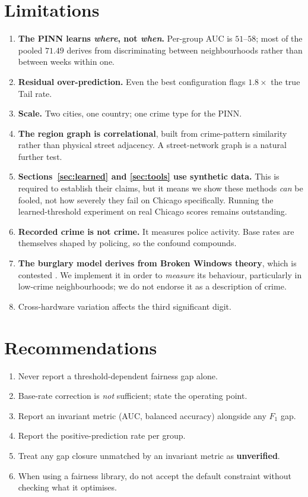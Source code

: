 \documentclass[11pt,a4paper]{article}
\begin{document}
\section{Limitations}
\begin{enumerate}\itemsep3pt
\item \textbf{The PINN learns \emph{where}, not \emph{when}.} Per-group AUC is
$51$--$58$; most of the pooled $71.49$ derives from discriminating between
neighbourhoods rather than between weeks within one.
\item \textbf{Residual over-prediction.} Even the best configuration flags
$1.8\times$ the true Tail rate.
\item \textbf{Scale.} Two cities, one country; one crime type for the PINN.
\item \textbf{The region graph is correlational}, built from crime-pattern
similarity rather than physical street adjacency. A street-network graph is a
natural further test.
\item \textbf{Sections~\ref{sec:learned} and \ref{sec:tools} use synthetic
data.} This is required to establish their claims, but it means we show these
methods \emph{can} be fooled, not how severely they fail on Chicago
specifically. Running the learned-threshold experiment on real Chicago scores
remains outstanding.
\item \textbf{Recorded crime is not crime.} It measures police activity. Base
rates are themselves shaped by policing, so the confound compounds.
\item \textbf{The burglary model derives from Broken Windows theory}, which is
contested \cite{sampson2004,goodson2021}. We implement it in order to
\emph{measure} its behaviour, particularly in low-crime neighbourhoods; we do
not endorse it as a description of crime.
\item Cross-hardware variation affects the third significant digit.
\end{enumerate}

\section{Recommendations}
\begin{enumerate}\itemsep2pt
\item Never report a threshold-dependent fairness gap alone.
\item Base-rate correction is \emph{not} sufficient; state the operating point.
\item Report an invariant metric (AUC, balanced accuracy) alongside any $F_1$ gap.
\item Report the positive-prediction rate per group.
\item Treat any gap closure unmatched by an invariant metric as \textbf{unverified}.
\item When using a fairness library, do not accept the default constraint
without checking what it optimises.
\end{enumerate}
\end{document}
